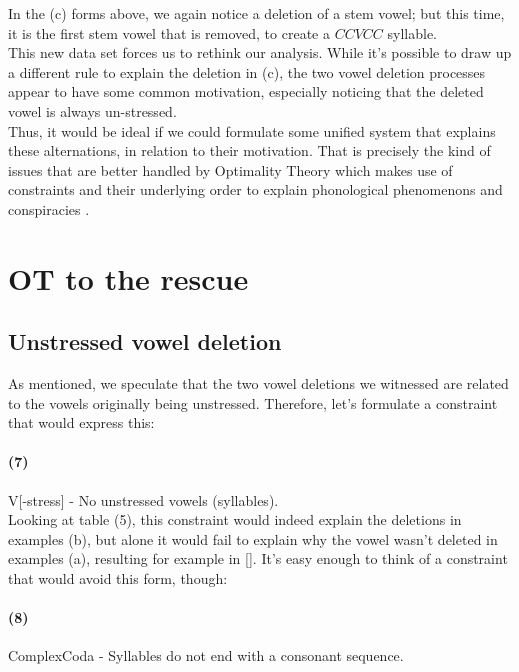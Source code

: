 \documentclass[12pt,draft]{article}
\begin{document}
In the (c) forms above, we again notice a deletion of a stem vowel; but this time, it is the first stem vowel that is removed, to create a $CCVCC$ syllable.
\\

This new data set forces us to rethink our analysis.
While it's possible to draw up a different rule to explain the deletion in (c), the two vowel deletion processes appear to have some common motivation, especially noticing that the deleted vowel is always un-stressed.
\\

Thus, it would be ideal if we could formulate some unified system that explains these alternations, in relation to their motivation.
That is precisely the kind of issues that are better handled by Optimality Theory \cite{kager1999optimality} which makes use of constraints and their underlying order to explain phonological phenomenons and conspiracies \cite{kisseberth1970functional}.

\pagebreak

\section {OT to the rescue}

\subsection {Unstressed vowel deletion}

As mentioned, we speculate that the two vowel deletions we witnessed are related to the vowels originally being unstressed.
Therefore, let's formulate a constraint that would express this:

\paragraph*{(7)} {{\sc *V[-stress]} - No unstressed vowels (syllables).}
\\

Looking at table (5), this constraint would indeed explain the deletions in examples (b), but alone it would fail to explain why the vowel wasn't deleted in examples (a), resulting for example in [].
It's easy enough to think of a constraint that would avoid this form, though:

\paragraph*{(8)} {{\sc *ComplexCoda} - Syllables do not end with a consonant sequence.}
\\
\end{document}
